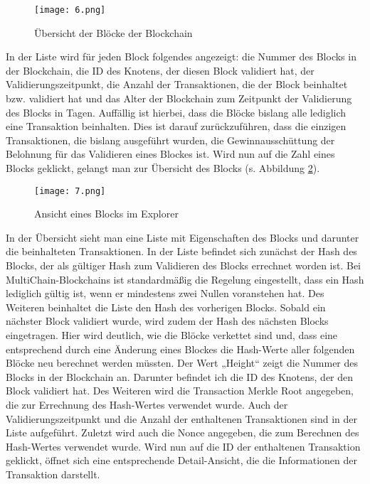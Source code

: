 \begin{figure}[h]
	\texttt{[image: 6.png]}
	\caption{Übersicht der Blöcke der Blockchain}
	\label{fig:6}
\end{figure}

In der Liste wird für jeden Block folgendes angezeigt: die Nummer des Blocks in der Blockchain, die ID des Knotens, der diesen Block validiert hat, der Validierungszeitpunkt, die Anzahl der Transaktionen, die der Block beinhaltet bzw. validiert hat und das Alter der Blockchain zum Zeitpunkt der Validierung des Blocks in Tagen. Auffällig ist hierbei, dass die Blöcke bislang alle lediglich eine Transaktion beinhalten. Dies ist darauf zurückzuführen, dass die einzigen Transaktionen, die bislang ausgeführt wurden, die Gewinnausschüttung der Belohnung für das Validieren eines Blockes ist. Wird nun auf die Zahl eines Blocks geklickt, gelangt man zur Übersicht des Blocks (s. Abbildung \ref{fig:7}).

\begin{figure}[h]
	\texttt{[image: 7.png]}
	\caption{Ansicht eines Blocks im Explorer}
	\label{fig:7}
\end{figure}

In der Übersicht sieht man eine Liste mit Eigenschaften des Blocks und darunter die beinhalteten Transaktionen. In der Liste befindet sich zunächst der Hash des Blocks, der als gültiger Hash zum Validieren des Blocks errechnet worden ist. Bei MultiChain-Blockchains ist standardmäßig die Regelung eingestellt, dass ein Hash lediglich gültig ist, wenn er mindestens zwei Nullen voranstehen hat. Des Weiteren beinhaltet die Liste den Hash des vorherigen Blocks. Sobald ein nächster Block validiert wurde, wird zudem der Hash des nächsten Blocks eingetragen. Hier wird deutlich, wie die Blöcke verkettet sind und, dass eine entsprechend durch eine Änderung eines Blockes die Hash-Werte aller folgenden Blöcke neu berechnet werden müssten. Der Wert „Height“ zeigt die Nummer des Blocks in der Blockchain an. Darunter befindet ich die ID des Knotens, der den Block validiert hat. Des Weiteren wird die Transaction Merkle Root angegeben, die zur Errechnung des Hash-Wertes verwendet wurde. Auch der Validierungszeitpunkt und die Anzahl der enthaltenen Transaktionen sind in der Liste aufgeführt. Zuletzt wird auch die Nonce angegeben, die zum Berechnen des Hash-Wertes verwendet wurde. Wird nun auf die ID der enthaltenen Transaktion  geklickt, öffnet sich eine entsprechende Detail-Ansicht, die die Informationen der Transaktion darstellt.

